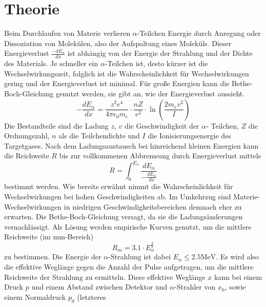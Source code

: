 \section{Theorie}
\label{sec:Theorie}

Beim Durchlaufen von Materie verlieren $\alpha$-Teilchen Energie durch Anregung 
oder Dissoziation von Molekülen, also der Aufspaltung eines Moleküls. Dieser 
Energieverlust $\frac{-dE_{\alpha}}{dx}$ ist abhängig von der Energie der 
Strahlung und der Dichte des Materials. Je schneller ein $\alpha$-Teilchen ist, 
desto kürzer ist die Wechselwirkungszeit, folglich ist die Wahrscheinlichkeit 
für Wechselwirkungen gering und der Energieverlust ist minimal. Für große 
Energien kann die Bethe-Boch-Gleichung genutzt werden, sie gibt an, wie der 
Energieverlust aussieht.
\begin{equation}
    \label{eqn:1}
    -\frac{dE_\alpha}{dx} = \frac{z^2 e^4}{4 \pi \epsilon_0 m_e} \cdot 
                           \frac{n Z}{v^2} \cdot \ln\left(\frac{2 m_e v^2}{I}\right)
\end{equation}
Die Bestandteile sind die Ladung $z$, $v$ die Geschwindigkeit der $\alpha$-
Teilchen, $Z$ die Ordnungszahl, $n$ als die Teilchendichte und $I$ die 
Ionisierungsenergie des Targetgases. Nach dem Ladungsaustausch bei hinreichend
kleinen Energien kann die Reichweite $R$ bis zur vollkommenen Abbremsung durch 
Energieverlust mittels 
\begin{equation}
    \label{eqn:2}
    R = \int_0^{E_\alpha} \frac{dE_{\alpha}}{-\frac{dE_\alpha}{dx}}
\end{equation}
bestimmt werden. Wie bereits erwähnt nimmt die Wahrscheinlichkeit für 
Wechselwirkungen bei hohen Geschwindigkeiten ab. Im Umkehrzug sind Materie-
Wechselwirkungen in niedrigen Geschwindigkeitsbereichen demnach eher zu erwarten.
Die Bethe-Boch-Gleichung versagt, da sie die Ladungsänderungen vernachlässigt.
Als Lösung werden empirische Kurven genutzt, um die mittlere Reichweite (im 
$\unit{\milli\meter}$-Bereich)
\begin{equation}
    \label{eqn:3}
    R_m = 3.1 \cdot E_{\alpha}^{\frac{3}{2}}
\end{equation}
zu bestimmen. Die Energie der $\alpha$-Strahlung ist dabei $E_{\alpha} \leq 
2.5 \unit{\mega\eV}$. Es wird also die effektive Weglänge gegen die Anzahl der 
Pulse aufgetragen, um die mittlere Reichweite der Strahlung zu ermitteln.
Diese effektive Weglänge $x$ kann bei einem Druck $p$ und einem Abstand zwischen 
Detektor und $\alpha$-Strahler von $x_0$, sowie einem Normaldruck $p_0$ (letzteres 
